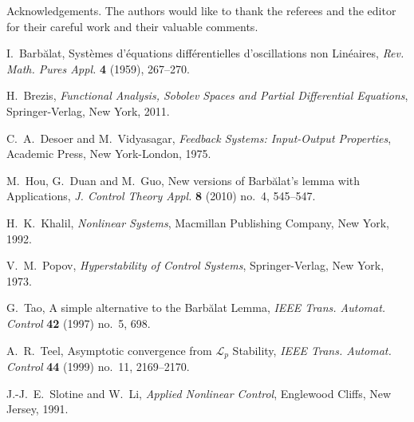\documentclass[10pt, a4paper, reqno]{amsart}
\theoremstyle{normal}
\begin{document}
\medskip

{

\footnotesize

{\sc Acknowledgements. }The authors would like to thank the referees and the editor for their careful work and their valuable comments.

}






\begin{thebibliography}{4}


I.~Barb{\u{a}}lat, Syst\`emes d'\'equations diff\'erentielles d'oscillations non Lin\'eaires, \emph{Rev. Math. Pures Appl.} \textbf{4} (1959), 267--270.

H.~Brezis, \emph{Functional Analysis, Sobolev Spaces and Partial Differential Equations}, Springer-Verlag, New York, 2011.

C.~A.~Desoer and M.~Vidyasagar, \emph{Feedback Systems: Input-Output Properties}, Academic Press, New York-London, 1975.

M.~Hou, G.~Duan and M.~Guo, New versions of Barb\u{a}lat's lemma with Applications, \emph{J. Control Theory Appl.} \textbf{8} (2010) no.~4,  545--547.

H.~K.~Khalil, \emph{Nonlinear Systems}, Macmillan Publishing Company, New York, 1992.

V.~M.~Popov, \emph{Hyperstability of Control Systems}, Springer-Verlag, New York, 1973.

G.~Tao, A simple alternative to the Barb\u{a}lat Lemma, \emph{IEEE Trans. Automat. Control} \textbf{42} (1997) no.~5,   698.

A.~R.~Teel, Asymptotic convergence from $\mathcal{L}_p$ Stability, \emph{IEEE Trans. Automat. Control} \textbf{44} (1999) no.~11,  2169--2170.

J.-J.~E.~Slotine and W.~Li, \emph{Applied Nonlinear Control}, Englewood Cliffs, New Jersey, 1991.




\end{thebibliography}




%
\end{document}
